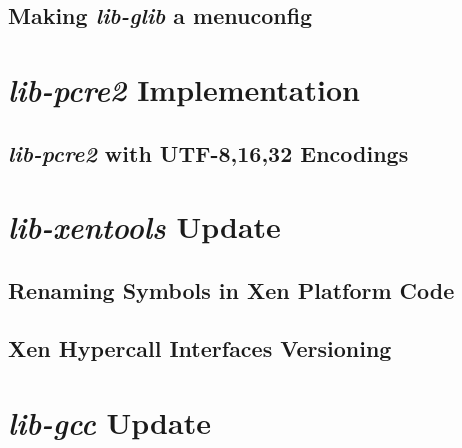 \subsection{Making \textit{lib-glib} a menuconfig}
\label{subsec:glib-menuconfig}

\section{\textit{lib-pcre2} Implementation}
\label{sec:lib-pcre2-impl}

\subsection{\textit{lib-pcre2} with UTF-8,16,32 Encodings}
\label{subsec:glib-menuconfig}

\section{\textit{lib-xentools} Update}
\label{sec:lib-xentools-update}

\subsection{Renaming Symbols in Xen Platform Code}
\label{subsec:xen-renaming-symbols}

\subsection{Xen Hypercall Interfaces Versioning}
\label{subsec:xen-interface-versioning}

\section{\textit{lib-gcc} Update}
\label{sec:lib-gcc-update}
